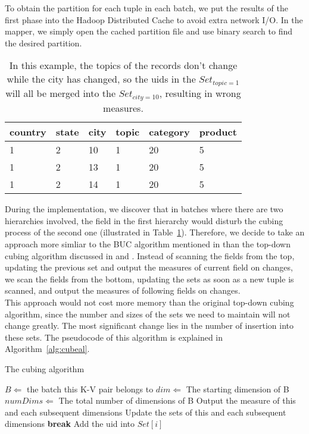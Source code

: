 \documentclass{article}
\begin{document}
To obtain the partition for each tuple in each batch, we put the results of the first phase into the Hadoop Distributed Cache to avoid extra network I/O. In the mapper, we simply open the cached partition file and use binary search to find the desired partition.

\begin{table}[h]
\centering
\begin{tabular}{l l l l l l}
country & state & city & topic & category & product \\
\hline
1 & 2 & 10 & 1 & 20 & 5 \\
1 & 2 & 13 & 1 & 20 & 5 \\
1 & 2 & 14 & 1 & 20 & 5

\end{tabular}
\caption{In this example, the topics of the records don't change while the city has changed, so the uids in the $Set_{topic=1}$ will all be merged into the $Set_{city=10}$, resulting in wrong measures.}
\label{table:interrupt}
\end{table}

During the implementation, we discover that in batches where there are two hierarchies involved, the field in the first hierarchy would disturb the cubing process of the second one (illustrated in Table~\ref{table:interrupt}). Therefore, we decide to take an approach more simliar to the BUC algorithm mentioned in \cite{beyer1999bottom} than the top-down cubing algorithm discussed in \cite{agarwal1996computation} and \cite{zhao1997array}. Instead of scanning the fields from the top, updating the previous set and output the measures of current field on changes, we scan the fields from the bottom, updating the sets as soon as a new tuple is scanned, and output the measures of following fields on changes. 
\\
This approach would not cost more memory than the original top-down cubing algorithm, since the number and sizes of the sets we need to maintain will not change greatly. The most significant change lies in the number of insertion into these sets. The pseudocode of this algorithm is explained in Algorithm~\ref{alg:cubeal}.

\begin{algorithm}[H]
\centering
\caption{The cubing algorithm}
\label{alg:cubeal}
\begin{algorithmic}[1]  
	\State $B \Leftarrow$ the batch this K-V pair belongs to
	\State $dim \Leftarrow$ The starting dimension of B
	\State $numDims \Leftarrow$ The total number of dimensions of B
			\State Output the measure of this and each subsequent dimensions
			\State Update the sets of this and each subsequent dimensions
			\State \textbf{break}
		\Else
			\State Add the uid into $Set[i]$
		\EndIf
	\EndFor
\EndFor   
\end{algorithmic}  
\end{algorithm}
\end{document}
